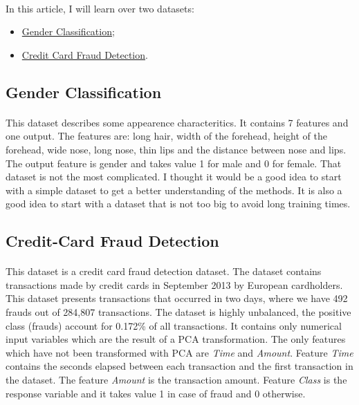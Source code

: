 \documentclass[10pt]{article}
\begin{document}
		\paragraph*{}
			In this article, I will learn over two datasets:
			\begin{itemize}
				\item \href{https://www.kaggle.com/datasets/elakiricoder/gender-classification-dataset}{Gender Classification};
				\item \href{https://www.kaggle.com/code/sngkadam/credit-card-fraud-detection/data}{Credit Card Fraud Detection}.
			\end{itemize}
		\subsection*{Gender Classification}
			\paragraph*{}
				This dataset describes some appearence characteritics. It contains 7 features and one output. The features are: long hair, width of the forehead, height of the forehead, wide nose, long nose, thin lips and the distance between nose and lips. The output feature is gender and takes value 1 for male and 0 for female. That dataset is not the most complicated. I thought it would be a good idea to start with a simple dataset to get a better understanding of the methods. It is also a good idea to start with a dataset that is not too big to avoid long training times.
		\subsection*{Credit-Card Fraud Detection}
			\paragraph*{}
				This dataset is a credit card fraud detection dataset. The dataset contains transactions made by credit cards in September 2013 by European cardholders. This dataset presents transactions that occurred in two days, where we have 492 frauds out of 284,807 transactions. The dataset is highly unbalanced, the positive class (frauds) account for 0.172\% of all transactions. It contains only numerical input variables which are the result of a PCA transformation. The only features which have not been transformed with PCA are \textit{Time} and \textit{Amount}. Feature \textit{Time} contains the seconds elapsed between each transaction and the first transaction in the dataset. The feature \textit{Amount} is the transaction amount. Feature \textit{Class} is the response variable and it takes value 1 in case of fraud and 0 otherwise.
\end{document}
